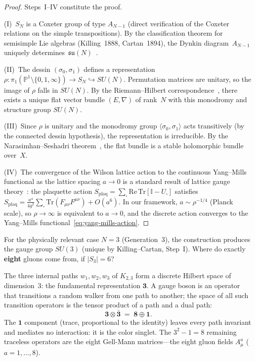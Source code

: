 \begin{proof}
Steps~I--IV constitute the proof.

(I)~$S_N$ is a Coxeter group of type $A_{N-1}$ (direct verification
of the Coxeter relations on the simple transpositions).
By the classification theorem for semisimple Lie algebras
(Killing~1888, Cartan~1894), the Dynkin diagram~$A_{N-1}$
uniquely determines~$\mathfrak{su}(N)$~\cite{humphreys1972}.

(II)~The dessin $(\sigma_0, \sigma_1)$ defines a representation
$\rho \colon \pi_1(\mathbb{P}^1 \setminus \{0,1,\infty\}) \to
S_N \hookrightarrow SU(N)$. Permutation matrices are
unitary, so the image of $\rho$ falls in $SU(N)$. By the
Riemann--Hilbert correspondence~\cite{deligne1970}, there exists a
unique flat vector bundle $(E, \nabla)$ of rank~$N$ with this
monodromy and structure group $SU(N)$.

(III)~Since $\rho$ is unitary and the monodromy group
$\langle \sigma_0, \sigma_1 \rangle$ acts transitively (by the
connected dessin hypothesis), the representation is irreducible.
By the Narasimhan--Seshadri theorem~\cite{narasimhan1965}, the
flat bundle is a stable holomorphic bundle over~$X$.

(IV)~The convergence of the Wilson lattice action to the continuous
Yang--Mills functional as the lattice spacing $a \to 0$ is a
standard result of lattice gauge
theory~\cite{wilson1974}: the plaquette action
$S_{\mathrm{plaq}} = \sum_{\square} \mathrm{Re}\,\mathrm{Tr}
[\mathbb{I} - U_\square]$ satisfies
$S_{\mathrm{plaq}} = \frac{a^4}{4g^2}\sum_\square
\mathrm{Tr}(F_{\mu\nu}F^{\mu\nu}) + O(a^6)$. In our framework,
$a \sim \rho^{-1/4}$ (Planck scale), so $\rho \to \infty$
is equivalent to $a \to 0$, and the discrete action converges to the
Yang--Mills functional~\eqref{eq:yang-mills-action}.
\end{proof}

\medskip\noindent
For the physically relevant case $N = 3$ (Generation~3), the
construction produces the gauge group $SU(3)$ (unique by
Killing--Cartan, Step~I). Where do exactly \textbf{eight}
gluons come from, if $|S_3| = 6$?

The three internal paths $w_1, w_2, w_3$ of $K_{2,3}$ form a
discrete Hilbert space of dimension~3: the fundamental representation
$\mathbf{3}$. A gauge boson is an operator that transitions a random
walker from one path to another; the space of all such transition
operators is the tensor product of a path and a dual path:
\[
  \mathbf{3} \otimes \bar{\mathbf{3}}
  \;=\; \mathbf{8} \oplus \mathbf{1}.
\]
The $\mathbf{1}$ component (trace, proportional to the identity) leaves
every path invariant and mediates no interaction: it is the color
singlet. The $3^2 - 1 = 8$ remaining traceless operators are the eight
Gell-Mann matrices---the eight gluon fields
$A_\mu^a$ ($a = 1, \ldots, 8$).

